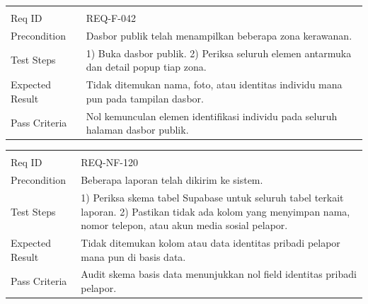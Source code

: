 \documentclass[11pt,a4paper]{article}
\begin{document}
\begin{longtable}{|L{2.6cm}|L{11.4cm}|}
\hline
{} \\ \hline
\endfirsthead
\hline
{} \\ \hline
\endhead
Req ID & REQ-F-042 \\ \hline
Precondition & Dasbor publik telah menampilkan beberapa zona kerawanan. \\ \hline
Test Steps & 1) Buka dasbor publik. 2) Periksa seluruh elemen antarmuka dan detail popup tiap zona. \\ \hline
Expected Result & Tidak ditemukan nama, foto, atau identitas individu mana pun pada tampilan dasbor. \\ \hline
Pass Criteria & Nol kemunculan elemen identifikasi individu pada seluruh halaman dasbor publik. \\ \hline
\end{longtable}

\begin{longtable}{|L{2.6cm}|L{11.4cm}|}
\hline
{} \\ \hline
\endfirsthead
\hline
{} \\ \hline
\endhead
Req ID & REQ-NF-120 \\ \hline
Precondition & Beberapa laporan telah dikirim ke sistem. \\ \hline
Test Steps & 1) Periksa skema tabel Supabase untuk seluruh tabel terkait laporan. 2) Pastikan tidak ada kolom yang menyimpan nama, nomor telepon, atau akun media sosial pelapor. \\ \hline
Expected Result & Tidak ditemukan kolom atau data identitas pribadi pelapor mana pun di basis data. \\ \hline
Pass Criteria & Audit skema basis data menunjukkan nol field identitas pribadi pelapor. \\ \hline
\end{longtable}

\normalsize
\end{document}
